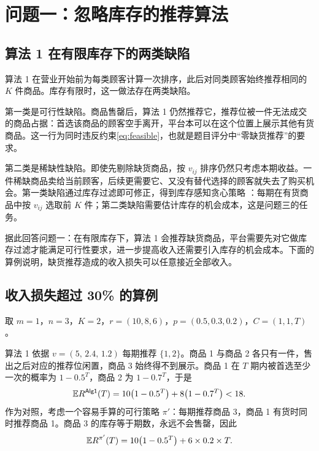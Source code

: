 \section{问题一：忽略库存的推荐算法}\label{sec:q1}

\subsection{算法 1 在有限库存下的两类缺陷}
算法 1 在营业开始前为每类顾客计算一次排序，此后对同类顾客始终推荐相同的 $K$ 件商品。库存有限时，这一做法存在两类缺陷。

第一类是可行性缺陷。商品售罄后，算法 1 仍然推荐它，推荐位被一件无法成交的商品占据：首选该商品的顾客空手离开，平台本可以在这个位置上展示其他有货商品。这一行为同时违反约束\eqref{eq:feasible}，也就是题目评分中“零缺货推荐”的要求。

第二类是稀缺性缺陷。即使先剔除缺货商品，按 $v_{ij}$ 排序仍然只考虑本期收益。一件稀缺商品卖给当前顾客，后续更需要它、又没有替代选择的顾客就失去了购买机会。第一类缺陷通过库存过滤即可修正，得到库存感知贪心策略 \Greedy{}：每期在有货商品中按 $v_{ij}$ 选取前 $K$ 件；第二类缺陷需要估计库存的机会成本，这是问题三的任务。

据此回答问题一：在有限库存下，算法 1 会推荐缺货商品，平台需要先对它做库存过滤才能满足可行性要求，进一步提高收入还需要引入库存的机会成本。下面的算例说明，缺货推荐造成的收入损失可以任意接近全部收入。

\subsection{收入损失超过 30\% 的算例}
\begin{example}\label{ex:q1}
取 $m=1$，$n=3$，$K=2$，$r=(10,8,6)$，$p=(0.5,0.3,0.2)$，$C=(1,1,T)$。
\end{example}

算法 1 依据 $v=(5,\,2.4,\,1.2)$ 每期推荐 $\{1,2\}$。商品 1 与商品 2 各只有一件，售出之后对应的推荐位闲置，商品 3 始终得不到展示。商品 1 在 $T$ 期内被首选至少一次的概率为 $1-0.5^T$，商品 2 为 $1-0.7^T$，于是
\begin{equation}
\mathbb E R^{\textsf{Alg1}}(T)=10\bigl(1-0.5^{T}\bigr)+8\bigl(1-0.7^{T}\bigr)<18.
\label{eq:q1naive}
\end{equation}
作为对照，考虑一个容易手算的可行策略 $\pi'$：每期推荐商品 3，商品 1 有货时同时推荐商品 1。商品 3 的库存等于期数，永远不会售罄，因此
\begin{equation}
\mathbb E R^{\pi'}(T)=10\bigl(1-0.5^{T}\bigr)+6\times0.2\times T.
\label{eq:q1feasible}
\end{equation}

